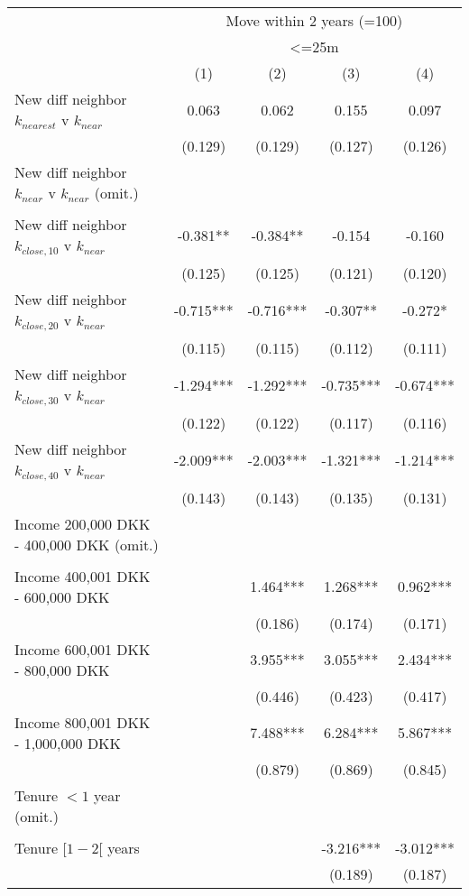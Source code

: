 \begin{tabular}{lcccc}
\toprule
 & \multicolumn{4}{c}{Move within 2 years (=100)} \\ 
\cmidrule(lr){2-5}
 & \multicolumn{4}{c}{<=25m} \\ 
\cmidrule(lr){2-5}
  & (1) & (2) & (3) & (4) \\ 
\midrule
New diff neighbor $k_{nearest}$ v $k_{near}$ & 0.063 & 0.062 & 0.155 & 0.097 \\ 
 & (0.129) & (0.129) & (0.127) & (0.126) \\ 
New diff neighbor $k_{near}$ v $k_{near}$ (omit.) & & & & \\ 
 &   &   &   &   \\ 
New diff neighbor $k_{close,10}$ v $k_{near}$ & -0.381** & -0.384** & -0.154 & -0.160 \\ 
 & (0.125) & (0.125) & (0.121) & (0.120) \\ 
New diff neighbor $k_{close,20}$ v $k_{near}$ & -0.715*** & -0.716*** & -0.307** & -0.272* \\ 
 & (0.115) & (0.115) & (0.112) & (0.111) \\ 
New diff neighbor $k_{close,30}$ v $k_{near}$ & -1.294*** & -1.292*** & -0.735*** & -0.674*** \\ 
 & (0.122) & (0.122) & (0.117) & (0.116) \\ 
New diff neighbor $k_{close,40}$ v $k_{near}$ & -2.009*** & -2.003*** & -1.321*** & -1.214*** \\ 
 & (0.143) & (0.143) & (0.135) & (0.131) \\ 
Income 200,000 DKK - 400,000 DKK (omit.) &  &  &  &  \\ 
 &  &  &  &  \\ 
Income 400,001 DKK - 600,000 DKK &  & 1.464*** & 1.268*** & 0.962*** \\ 
 &  & (0.186) & (0.174) & (0.171) \\ 
Income 600,001 DKK - 800,000 DKK &  & 3.955*** & 3.055*** & 2.434*** \\ 
 &  & (0.446) & (0.423) & (0.417) \\ 
Income 800,001 DKK - 1,000,000 DKK &  & 7.488*** & 6.284*** & 5.867*** \\ 
 &  & (0.879) & (0.869) & (0.845) \\ 
Tenure $<1$ year (omit.) &  &  &  &  \\ 
 &  &  &  &  \\ 
Tenure $[1-2[$ years &  &  & -3.216*** & -3.012*** \\ 
 &  &  & (0.189) & (0.187) \\ 

\end{tabular}
